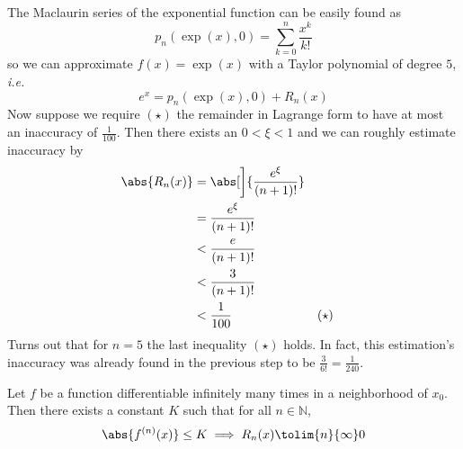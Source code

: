 \begin{exm}\label{exm-exp-taylor-series}
	The Maclaurin series of the exponential function can be easily found as
	\begin{equation*}
		p_n(\exp(x),0) = \sum_{k=0}^n \frac{x^k}{k!}
	\end{equation*}
	so we can approximate $f(x)=\exp(x)$ with a Taylor polynomial of degree $5$, \textit{i.e.}
	\begin{equation*}
		e^x = p_n(\exp(x),0) + R_n(x)
	\end{equation*}
	Now suppose we require $(\star)$ the remainder in Lagrange form to have at most an
	inaccuracy of $\tfrac{1}{100}$. Then there exists an $0<\xi<1$ and we can roughly
	estimate inaccuracy by
	\begin{align*}
		\abs{R_n(x)} & = \abs[\bigg]{\frac{e^\xi}{(n+1)!}}              \\
		             & = \frac{e^\xi}{(n+1)!}                           \\
		             & < \frac{e}{(n+1)!}                               \\
		             & < \frac{3}{(n+1)!}                               \\
		             & < \frac{1}{100}                     &  & (\star)
	\end{align*}
	Turns out that for $n=5$ the last inequality $(\star)$ holds. In fact, this
	estimation's inaccuracy was already found in the previous step to be $\tfrac{3}{6!}=\tfrac{1}{240}$.
\end{exm}

\begin{thm}\label{thm-infinite-taylor-lagrange-remainder-theorem}
	Let $f$ be a function differentiable infinitely many times in a neighborhood of $x_0$.
	Then there exists a constant $K$ such that for all $n\in\mathbb{N}$,
	\begin{equation}\label{eq-infinite-taylor-lagrange-remainder-theorem}
		\abs{f^{(n)}(x)} \leq K \implies R_n(x) \tolim{n}{\infty} 0
	\end{equation}
\end{thm}
